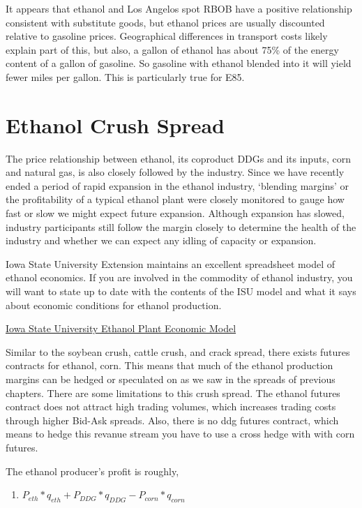 \documentclass[]{book}
\providecommand{\tightlist}{%
  \setlength{\itemsep}{0pt}\setlength{\parskip}{0pt}}
\theoremstyle{definition}
\theoremstyle{definition}
\theoremstyle{remark}
\begin{document}
It appears that ethanol and Los Angelos spot RBOB have a positive
relationship consistent with substitute goods, but ethanol prices are
usually discounted relative to gasoline prices. Geographical differences
in transport costs likely explain part of this, but also, a gallon of
ethanol has about 75\% of the energy content of a gallon of gasoline. So
gasoline with ethanol blended into it will yield fewer miles per gallon.
This is particularly true for E85.

\section{Ethanol Crush Spread}\label{ethanol-crush-spread}

The price relationship between ethanol, its coproduct DDGs and its
inputs, corn and natural gas, is also closely followed by the industry.
Since we have recently ended a period of rapid expansion in the ethanol
industry, `blending margins' or the profitability of a typical ethanol
plant were closely monitored to gauge how fast or slow we might expect
future expansion. Although expansion has slowed, industry participants
still follow the margin closely to determine the health of the industry
and whether we can expect any idling of capacity or expansion.

Iowa State University Extension maintains an excellent spreadsheet model
of ethanol economics. If you are involved in the commodity of ethanol
industry, you will want to state up to date with the contents of the ISU
model and what it says about economic conditions for ethanol production.

\href{https://www.extension.iastate.edu/agdm/articles/hof/HofJan08.html}{Iowa
State University Ethanol Plant Economic Model}

Similar to the soybean crush, cattle crush, and crack spread, there
exists futures contracts for ethanol, corn. This means that much of the
ethanol production margins can be hedged or speculated on as we saw in
the spreads of previous chapters. There are some limitations to this
crush spread. The ethanol futures contract does not attract high trading
volumes, which increases trading costs through higher Bid-Ask spreads.
Also, there is no ddg futures contract, which means to hedge this
revanue stream you have to use a cross hedge with with corn futures.

The ethanol producer's profit is roughly,

\begin{enumerate}
\def\labelenumi{\arabic{enumi}.}
\tightlist
\item
  \(P_{eth}*q_{eth} + P_{DDG}*q_{DDG} - P_{corn}*q_{corn}\)
\end{enumerate}
\end{document}
